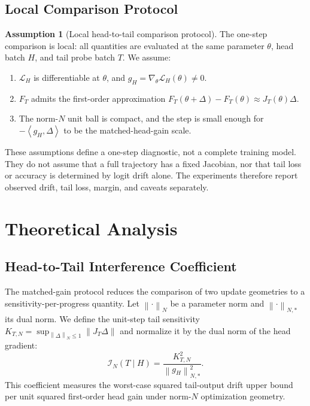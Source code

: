 \documentclass{article}
\theoremstyle{definition}
\newtheorem{assumption}[theorem]{Assumption}
\newcommand{\Loss}{\mathcal L}
\newcommand{\I}{\mathcal I}
\newcommand{\norm}[1]{\left\lVert #1 \right\rVert}
\newcommand{\inner}[2]{\left\langle #1,#2 \right\rangle}
\begin{document}
\subsection{Local Comparison Protocol}

\begin{assumption}[Local head-to-tail comparison protocol]
\label{assump:local-head-tail}
The one-step comparison is local: all quantities are evaluated at the same parameter \(\theta\), head batch \(H\), and tail probe batch \(T\). We assume:
\begin{enumerate}
  \item \(\Loss_H\) is differentiable at \(\theta\), and \(g_H=\nabla_\theta\Loss_H(\theta)\ne 0\).
  \item \(F_T\) admits the first-order approximation \(F_T(\theta+\Delta)-F_T(\theta)\approx J_T(\theta)\Delta\).
  \item The norm-\(N\) unit ball is compact, and the step is small enough for \(-\inner{g_H}{\Delta}\) to be the matched-head-gain scale.
\end{enumerate}
\end{assumption}

These assumptions define a one-step diagnostic, not a complete training model. They do not assume that a full trajectory has a fixed Jacobian, nor that tail loss or accuracy is determined by logit drift alone. The experiments therefore report observed drift, tail loss, margin, and caveats separately.

\section{Theoretical Analysis}

\subsection{Head-to-Tail Interference Coefficient}

The matched-gain protocol reduces the comparison of two update geometries to a sensitivity-per-progress quantity. Let \(\norm{\cdot}_N\) be a parameter norm and \(\norm{\cdot}_{N,*}\) its dual norm. We define the unit-step tail sensitivity \(K_{T,N}=\sup_{\norm{\Delta}_N\le 1}\norm{J_T\Delta}\) and normalize it by the dual norm of the head gradient:
\[
\boxed{
\I_N(T\mid H)
=
\frac{K_{T,N}^2}{\norm{g_H}_{N,*}^2}.
}
\]
This coefficient measures the worst-case squared tail-output drift upper bound per unit squared first-order head gain under norm-\(N\) optimization geometry.
\end{document}
